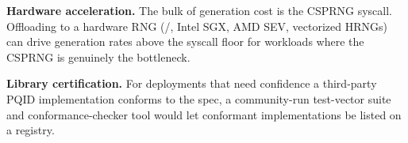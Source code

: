 \textbf{Hardware acceleration.} The bulk of generation cost is the CSPRNG syscall. Offloading to a hardware RNG (/, Intel SGX, AMD SEV, vectorized HRNGs) can drive generation rates above the syscall floor for workloads where the CSPRNG is genuinely the bottleneck.

\textbf{Library certification.} For deployments that need confidence a third-party PQID implementation conforms to the spec, a community-run test-vector suite and conformance-checker tool would let conformant implementations be listed on a registry.
